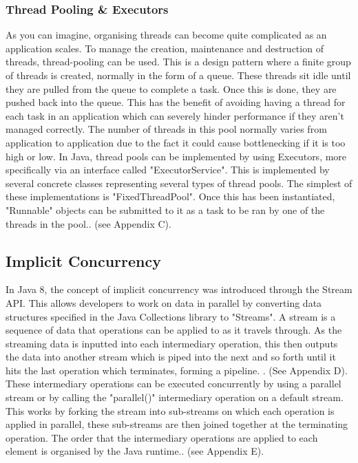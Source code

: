 \documentclass[]{report}
\begin{document}
\subsubsection{Thread Pooling \& Executors}
As you can imagine, organising threads can become quite complicated as an application scales. To manage the creation, maintenance and destruction of threads, thread-pooling can be used. This is a design pattern where a finite group of threads is created, normally in the form of a queue. These threads sit idle until they are pulled from the queue to complete a task. Once this is done, they are pushed back into the queue. This has the benefit of avoiding having a thread for each task in an application which can severely hinder performance if they aren't managed correctly. The number of threads in this pool normally varies from application to application due to the fact it could cause bottlenecking if it is too high or low. In Java, thread pools can be implemented by using Executors, more specifically via an interface called "ExecutorService". This is implemented by several concrete classes representing several types of thread pools. The simplest of these implementations is "FixedThreadPool". Once this has been instantiated, "Runnable" objects can be submitted to it as a task to be ran by one of the threads in the pool.\cite{Thread Pools}. (see Appendix C).

\subsection{Implicit Concurrency}

In Java 8, the concept of implicit concurrency was introduced through the Stream API. This allows developers to work on data in parallel by converting data structures specified in the Java Collections library to "Streams". A stream is a sequence of data that operations can be applied to as it travels through. As the streaming data is inputted into each intermediary operation, this then outputs the data into another stream which is piped into the next and so forth until it hits the last operation which terminates, forming a pipeline. \cite{Stream API}. (See Appendix D). These intermediary operations can be executed concurrently by using a parallel stream or by calling the "parallel()" intermediary operation on a default stream. This works by forking the stream into sub-streams on which each operation is applied in parallel, these sub-streams are then joined together at the terminating operation. The order that the intermediary operations are applied to each element is organised by the Java runtime.\cite{Stream API}. (see Appendix E).
\end{document}
